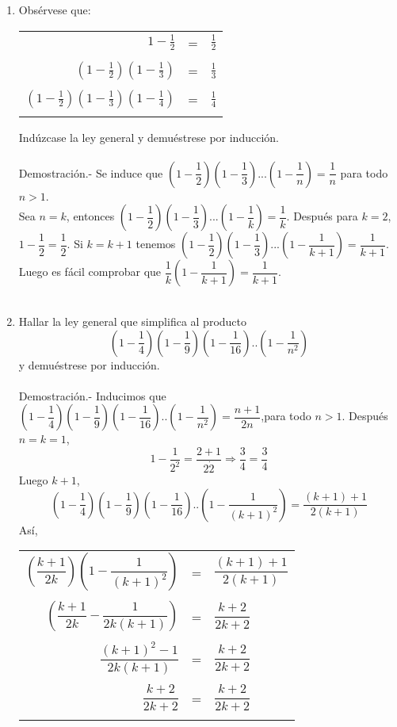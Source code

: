 \begin{enumerate}[\bfseries  1.]
\item Obsérvese que:
\begin{center}
\begin{tabular}{r c l}
$1-\frac{1}{2}$&=&$\frac{1}{2}$\\\\
$(1-\frac{1}{2})(1-\frac{1}{3})$&=&$\frac{1}{3}$\\\\
$(1-\frac{1}{2})(1-\frac{1}{3})(1-\frac{1}{4})$&=&$\frac{1}{4}$\\\\
\end{tabular}
\end{center}
Indúzcase la ley general y demuéstrese por inducción.\\\\
Demostración.- \; Se induce que $\left( 1-\dfrac{1}{2} \right)\left( 1-\dfrac{1}{3} \right)...\left(1- \dfrac{1}{n} \right)=\dfrac{1}{n}$ para todo $n>1$.\\
Sea $n=k$, entonces $\left( 1-\dfrac{1}{2} \right)\left( 1-\dfrac{1}{3} \right)...\left(1- \dfrac{1}{k} \right)=\dfrac{1}{k}$. Después para $k=2$, \; $1-\dfrac{1}{2}=\dfrac{1}{2}$. Si $k=k+1$ tenemos $\left( 1-\dfrac{1}{2} \right) \left( 1-\dfrac{1}{3} \right)...\left(1- \dfrac{1}{k+1} \right)=\dfrac{1}{k+1}$. Luego es fácil comprobar que 
$\dfrac{1}{k}\left(1 - \dfrac{1}{k+1} \right)=\dfrac{1}{k+1}$. \\\\

\item Hallar la ley general que simplifica al producto $$\left( 1-\dfrac{1}{4} \right)\left( 1-\dfrac{1}{9} \right)\left( 1- \dfrac{1}{16} \right)..\left( 1- \dfrac{1}{n^2} \right)$$ y demuéstrese por inducción.\\\\
Demostración.- \; Inducimos que $\left( 1-\dfrac{1}{4} \right)\left( 1-\dfrac{1}{9} \right)\left( 1- \dfrac{1}{16} \right)..\left( 1- \dfrac{1}{n^2} \right)=\dfrac{n+1}{2n}$,para todo $n>1$. Después $n=k=1$, $$1-\dfrac{1}{2^2}=\dfrac{2+1}{2\dot 2} \Rightarrow \dfrac{3}{4}=\dfrac{3}{4}$$ 
Luego $k+1$, $$\left( 1-\dfrac{1}{4} \right)\left( 1-\dfrac{1}{9} \right)\left( 1- \dfrac{1}{16} \right)..\left( 1- \dfrac{1}{(k+1)^2} \right)=\dfrac{(k+1)+1}{2(k+1)}$$
Así,
\begin{center}
\begin{tabular}{r c l}
$\left( \dfrac{k+1}{2k}\right) \left( 1- \dfrac{1}{(k+1)^2} \right)$&=&$\dfrac{(k+1)+1}{2(k+1)}$\\\\
$\left( \dfrac{k+1}{2k} - \dfrac{1}{2k(k+1)} \right)$&=&$\dfrac{k+2}{2k+2}$\\\\
$\dfrac{(k+1)^2-1}{2k(k+1)}$&=&$\dfrac{k+2}{2k+2}$\\\\
$\dfrac{k+2}{2k+2}$&=&$\dfrac{k+2}{2k+2}$\\\\
\end{tabular}
\end{center}


\end{enumerate}
